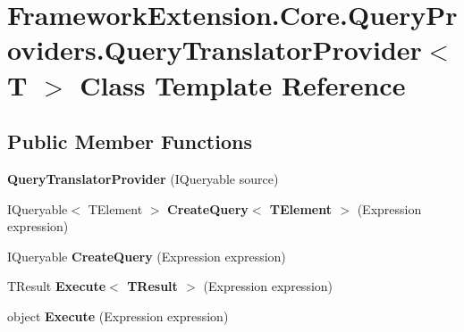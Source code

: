 \hypertarget{class_framework_extension_1_1_core_1_1_query_providers_1_1_query_translator_provider-g}{\section{Framework\-Extension.\-Core.\-Query\-Providers.\-Query\-Translator\-Provider$<$ T $>$ Class Template Reference}
\label{class_framework_extension_1_1_core_1_1_query_providers_1_1_query_translator_provider-g}
}
\subsection*{Public Member Functions}
\begin{DoxyCompactItemize}
\item 
\hypertarget{class_framework_extension_1_1_core_1_1_query_providers_1_1_query_translator_provider-g_ab0c65223e0b5884df23f9ab7bb49d805}{{\bfseries Query\-Translator\-Provider} (I\-Queryable source)}\label{class_framework_extension_1_1_core_1_1_query_providers_1_1_query_translator_provider-g_ab0c65223e0b5884df23f9ab7bb49d805}

\item 
\hypertarget{class_framework_extension_1_1_core_1_1_query_providers_1_1_query_translator_provider-g_ae7c41665df72c69f32dcc82dd007bda3}{I\-Queryable$<$ T\-Element $>$ {\bfseries Create\-Query$<$ T\-Element $>$} (Expression expression)}\label{class_framework_extension_1_1_core_1_1_query_providers_1_1_query_translator_provider-g_ae7c41665df72c69f32dcc82dd007bda3}

\item 
\hypertarget{class_framework_extension_1_1_core_1_1_query_providers_1_1_query_translator_provider-g_ac1a76fcdabb96d88ceb4491a4a15e3b4}{I\-Queryable {\bfseries Create\-Query} (Expression expression)}\label{class_framework_extension_1_1_core_1_1_query_providers_1_1_query_translator_provider-g_ac1a76fcdabb96d88ceb4491a4a15e3b4}

\item 
\hypertarget{class_framework_extension_1_1_core_1_1_query_providers_1_1_query_translator_provider-g_ae24720331cd0aec88eafb055b01e6847}{T\-Result {\bfseries Execute$<$ T\-Result $>$} (Expression expression)}\label{class_framework_extension_1_1_core_1_1_query_providers_1_1_query_translator_provider-g_ae24720331cd0aec88eafb055b01e6847}

\item 
\hypertarget{class_framework_extension_1_1_core_1_1_query_providers_1_1_query_translator_provider-g_a9c6fcbe98906833d18b0ea173ec065e8}{object {\bfseries Execute} (Expression expression)}\label{class_framework_extension_1_1_core_1_1_query_providers_1_1_query_translator_provider-g_a9c6fcbe98906833d18b0ea173ec065e8}

\end{DoxyCompactItemize}
